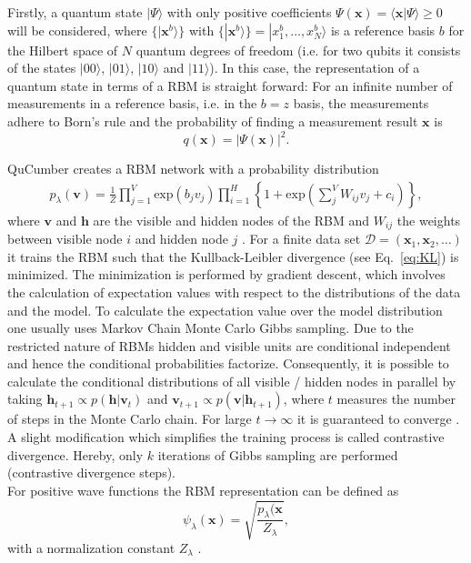 \documentclass[pra,aps,showpacs,groupedaddress,superscriptaddress,twocolumn,toc=flat,biblatex,footinbib]{revtex4-1}
\newcommand{\ket}[1]{|#1\rangle}
\renewcommand{\vec}[1]{\bm{#1}}
\begin{document}
Firstly, a quantum state $\ket{\Psi}$ with only positive coefficients $\Psi(\vec{x}) = \langle\vec{x} \vert \Psi \rangle \geq 0$ will be considered, where 
$\{\ket{\vec{x}^b}\}$ with $\{\ket{\vec{x}^b}\} = \ket{x_1^b, \dots , x_N^b}$ is a reference basis $b$ for the Hilbert space of $N$ quantum degrees of freedom (i.e. for two qubits it consists of the states $\ket{00}$, $\ket{01}$, $\ket{10}$ and $\ket{11}$). In this case, the representation of a quantum state in terms of a RBM is straight forward: For an infinite number of measurements in a reference basis, i.e. in the $b = z$ basis, the measurements adhere to Born's rule and the probability of finding a measurement result $\vec{x}$ is 
$$
q(\vec{x})=\vert \Psi (\vec{x})\vert^2.$$

QuCumber creates a RBM network with a probability distribution \begin{align}
p_\lambda (\vec{v}) =\frac{1}{Z}\prod_{j=1}^{V}\mathrm{exp}\left( b_j v_j\right) \prod_{i=1}^{H} \left\{ 1 + \mathrm{exp}\left( \sum_j^V W_{ij} v_j +c_i \right)\right\},
\label{eq:RBM_prob2}
\end{align} 
where $\vec{v}$ and $\vec{h}$ are the visible and hidden nodes of the RBM and $W_{ij}$ the weights between visible node $i$ and hidden node $j$ \cite{Goodfellow}. For a finite data set $\mathcal{D}= (\vec{x}_1, \vec{x}_2, \dots)$ it trains the RBM
such that the Kullback-Leibler divergence (see Eq.~\eqref{eq:KL})
is minimized. The minimization is performed by gradient descent, which involves the calculation of expectation values with respect to the distributions of the data and the model. To calculate the expectation value over the model distribution one usually uses Markov Chain Monte Carlo Gibbs sampling. Due to the restricted nature of RBMs hidden and visible units are conditional independent and hence the conditional probabilities factorize. Consequently, it is possible to calculate the conditional distributions of all visible / hidden nodes in parallel by taking $\vec{h}_{t+1} \propto p(\vec{h}\vert \vec{v}_t)$ and $\vec{v}_{t+1} \propto p(\vec{v}\vert \vec{h}_{t+1})$, where $t$ measures the number of steps in the Monte Carlo chain. For large $t\to \infty$ it is guaranteed to converge \cite{Mehta2019}. A slight modification which simplifies the training process is called contrastive divergence. Hereby, only $k$ iterations of Gibbs sampling are performed (contrastive divergence steps).\\


For positive wave functions the RBM representation can be defined as
$$
\psi_\lambda(\vec{x}) = \sqrt{\frac{p_\lambda(\vec{x}}{Z_\lambda}},
$$
with a normalization constant $Z_\lambda$ \cite{Qucumber2019}. 
\end{document}
